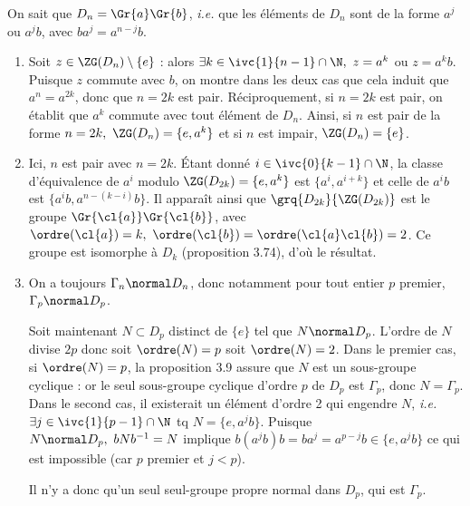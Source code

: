 On sait que $D_n = \Gr{a}\Gr{b}$, \emph{i.e.} que les éléments de $D_n$ sont de la forme $a^j$ ou $a^jb$, avec $ba^j = a^{n-j}b$.


\begin{enumerate}
    \item Soit $z\in \ZG(D_n) \setminus \{e\}$ : alors $\exists k\in \ivc{1}{n-1}\cap \N,~ z = a^k$ ou $z=a^kb$. Puisque $z$ commute avec $b$, on 
     montre dans les deux cas que cela induit que $a^n = a^{2k}$, donc que $n=2k$ est pair. Réciproquement, si $n=2k$ est pair, on établit que $a^k$ commute avec 
     tout élément de $D_n$. Ainsi, si $n$ est pair de la forme $n=2k,~ \ZG(D_n) = \{e, a^k\}$ et si $n$ est impair, $\ZG(D_n) = \{e\}$.
     \item Ici, $n$ est pair avec $n= 2k$. Étant donné $i \in \ivc{0}{k-1}\cap \N$, la classe d'équivalence de $a^i$ modulo $\ZG(D_{2k})=\{e, a^k\}$ 
     est $\{a^i, a^{i+k}\}$ et celle de $a^ib$ est $\{a^ib, a^{n-(k-i)}b\}$. Il apparaît ainsi que $\grq{D_{2k}}{\ZG(D_{2k})}$ est le groupe 
     $\Gr{\cl{a}}\Gr{\cl{b}}$, avec $\ordre(\cl{a}) = k,~ \ordre(\cl{b})=\ordre(\cl{a}\cl{b}) =2$. Ce groupe est isomorphe à $D_k$ (proposition 3.74), d'où le résultat.
     \item On a toujours $\Gamma_n \normal D_n$, donc notamment pour tout entier $p$ premier, $\Gamma_p \normal D_p$. 
     
     Soit maintenant $N\subset D_p$ distinct de $\{e\}$ tel que $N\normal D_p$. L'ordre de $N$ divise $2p$ donc soit $\ordre(N)=p$ soit $\ordre(N)=2$. 
     Dans le premier cas, si $\ordre(N)=p$, la proposition 3.9 assure que $N$ est un sous-groupe cyclique : or le seul sous-groupe cyclique d'ordre $p$ de $D_p$ est $\Gamma_p$, donc 
     $N=\Gamma_p$. Dans le second cas, il existerait un élément d'ordre 2 qui engendre $N$, \emph{i.e.} $\exists j\in \ivc{1}{p-1}\cap \N$ tq $N=\{e, a^jb\}$. Puisque $N\normal D_p,~ bNb^{-1} = N$ implique 
     $b(a^jb)b = ba^j = a^{p-j}b \in \{e, a^jb\}$ ce qui est impossible (car $p$ premier et $j<p$). 

     Il n'y a donc qu'un seul seul-groupe propre normal dans $D_p$, qui est $\Gamma_p$.
    \end{enumerate}